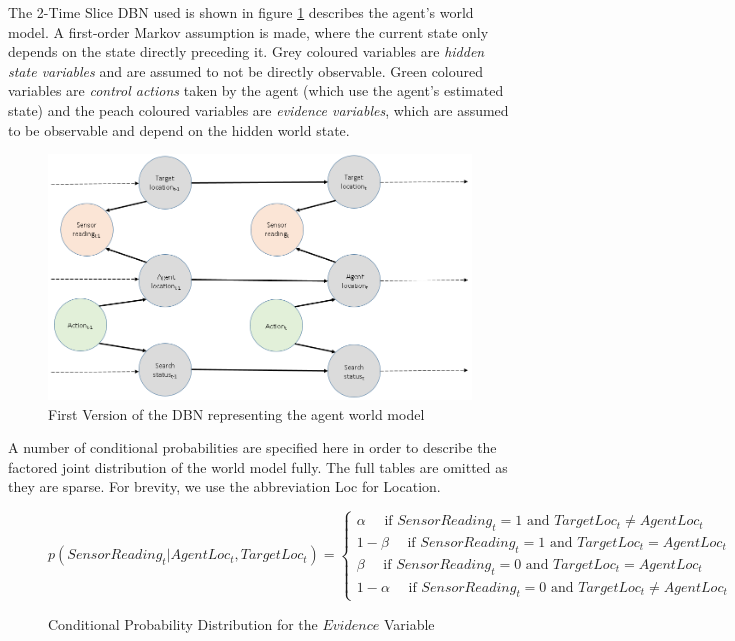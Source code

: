 The 2-Time Slice DBN used is shown in figure \ref{fig:FirstDBNUsed} describes the agent's world model. A first-order Markov assumption is made, where the current state only depends on the state directly preceding it. Grey coloured variables are \textit{hidden state variables} and are assumed to not be directly observable. Green coloured variables are \textit{control actions} taken by the agent (which use the agent's estimated state) and the peach coloured variables are \textit{evidence variables}, which are assumed to be observable and depend on the hidden world state. 
\begin{figure}
    \centering
    \includegraphics[width = 0.8\linewidth]{Chapters/MultiAgentTargetDetection/Figs/DBNWithMultipleHiddenState.PNG}
     \caption{First Version of the DBN representing the agent world model}
    \label{fig:FirstDBNUsed}
\end{figure}
A number of conditional probabilities are specified here in order to describe the factored joint distribution of the world model fully. The full tables are omitted as they are sparse. For brevity, we use the abbreviation Loc for Location.



\begin{figure}[H]
\scriptsize
\begin{equation}\label{eqn:EvidenceVarsProbs}
    p(SensorReading_t | AgentLoc_{t}, TargetLoc_{t})  = 
    \begin{cases}
    \alpha \quad \text{ if } SensorReading_t=1 \text{ and } TargetLoc_t \neq AgentLoc_t
    \\
    1-\beta \quad \text{ if } SensorReading_t=1 \text{ and } TargetLoc_t = AgentLoc_t
    \\
    \beta \quad \text{ if } SensorReading_t=0 \text{ and } TargetLoc_t = AgentLoc_t
    \\
    1-\alpha \quad \text{ if } SensorReading_t=0 \text{ and } TargetLoc_t \neq AgentLoc_t
    \end{cases}
\end{equation}
\caption{Conditional Probability Distribution for the $Evidence$ Variable}
\end{figure}


